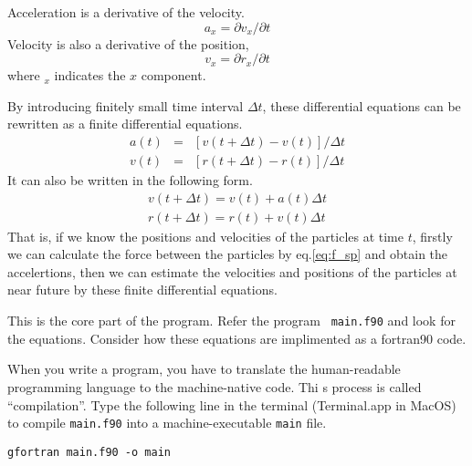 \documentclass[a4,10pt]{article}
\begin{document}
Acceleration is a derivative of the velocity.
\begin{equation}
a_x = \partial v_x / \partial t
\end{equation}
Velocity is also a derivative of the position,
\begin{equation}
v_x = \partial r_x / \partial t
\end{equation}
where $_x$ indicates the $x$ component.

By introducing finitely small time interval $\Delta t$, these
differential equations can be rewritten as a finite differential
equations.
\begin{eqnarray}
a(t)&=&[ v(t+\Delta t) - v(t) ] / \Delta t\\
v(t)&=&[ r(t+\Delta t) - r(t) ] / \Delta t
\end{eqnarray}
It can also be written in the following form.
\begin{eqnarray}
v(t+\Delta t) = v(t) + a(t) \Delta t\\
r(t+\Delta t) = r(t) + v(t) \Delta t
\end{eqnarray}
That is, if we know the positions and velocities of the particles at
time $t$, firstly we can calculate the force between the particles by
eq.\ref{eq:f_sp} and obtain the accelertions, then we can estimate the
velocities and positions of the particles at near future by these
finite differential equations.

This is the core part of the program.  Refer the program {\tt
  main.f90} and look for the equations.  Consider how these equations
are implimented as a fortran90 code.

When you write a program, you have to translate the human-readable
programming language to the machine-native code.  Thi s process is
called ``compilation''.  Type the following line in the terminal
(Terminal.app in MacOS) to compile {\tt main.f90} into a
machine-executable {\tt main} file.
\begin{screen}
\begin{verbatim}
gfortran main.f90 -o main
\end{verbatim}
\end{screen}
\end{document}
